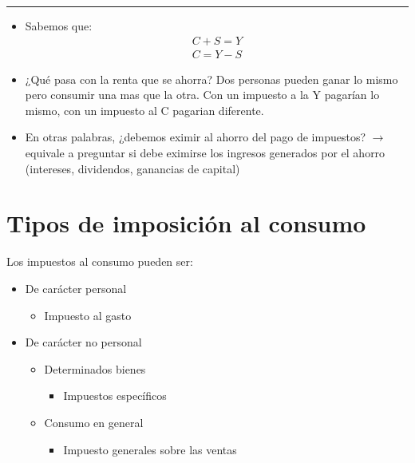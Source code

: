 \documentclass[
  letterpaper,
  DIV=11,
  numbers=noendperiod]{scrartcl}
\providecommand{\tightlist}{%
  \setlength{\itemsep}{0pt}\setlength{\parskip}{0pt}}\usepackage{longtable,booktabs,array}
\begin{document}
\begin{center}\rule{0.5\linewidth}{0.5pt}\end{center}

\begin{itemize}
\tightlist
\item
  Sabemos que: \[\begin{aligned}
          C+S=Y \\
          C=Y-S
        \end{aligned}\]
\item
  ¿Qué pasa con la renta que se ahorra? Dos personas pueden ganar lo
  mismo pero consumir una mas que la otra. Con un impuesto a la Y
  pagarían lo mismo, con un impuesto al C pagarian diferente.
\item
  En otras palabras, ¿debemos eximir al ahorro del pago de impuestos?
  \(\longrightarrow\) equivale a preguntar si debe eximirse los ingresos
  generados por el ahorro (intereses, dividendos, ganancias de capital)
\end{itemize}

\section{\texorpdfstring{\textbf{Tipos de imposición al
consumo}}{Tipos de imposición al consumo}}\label{tipos-de-imposiciuxf3n-al-consumo}

Los impuestos al consumo pueden ser:

\begin{itemize}
\tightlist
\item
  De carácter personal

  \begin{itemize}
  \tightlist
  \item
    Impuesto al gasto
  \end{itemize}
\item
  De carácter no personal

  \begin{itemize}
  \tightlist
  \item
    Determinados bienes

    \begin{itemize}
    \tightlist
    \item
      Impuestos específicos
    \end{itemize}
  \item
    Consumo en general

    \begin{itemize}
    \tightlist
    \item
      Impuesto generales sobre las ventas
    \end{itemize}
  \end{itemize}
\end{itemize}
\end{document}
